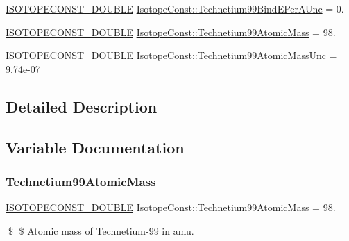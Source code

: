 \begin{DoxyCompactItemize}
\mbox{\hyperlink{group___isotope_const-_macros_ga8f45a7272ce02c0b4c65c44636ed719a}{I\+S\+O\+T\+O\+P\+E\+C\+O\+N\+S\+T\+\_\+\+D\+O\+U\+B\+LE}} \mbox{\hyperlink{group___isotope_const-_technetium-_tc99_gaf745b14e688dd0e81672a41bdda72732}{Isotope\+Const\+::\+Technetium99\+Bind\+E\+Per\+A\+Unc}} = 0.
\item 
\mbox{\hyperlink{group___isotope_const-_macros_ga8f45a7272ce02c0b4c65c44636ed719a}{I\+S\+O\+T\+O\+P\+E\+C\+O\+N\+S\+T\+\_\+\+D\+O\+U\+B\+LE}} \mbox{\hyperlink{group___isotope_const-_technetium-_tc99_gab5e99f199f8fefacbe1b0d6787efbb35}{Isotope\+Const\+::\+Technetium99\+Atomic\+Mass}} = 98.
\item 
\mbox{\hyperlink{group___isotope_const-_macros_ga8f45a7272ce02c0b4c65c44636ed719a}{I\+S\+O\+T\+O\+P\+E\+C\+O\+N\+S\+T\+\_\+\+D\+O\+U\+B\+LE}} \mbox{\hyperlink{group___isotope_const-_technetium-_tc99_gaf95401929c0e7df71b752dec537c8b99}{Isotope\+Const\+::\+Technetium99\+Atomic\+Mass\+Unc}} = 9.\+74e-\/07
\end{DoxyCompactItemize}


\subsection{Detailed Description}


\subsection{Variable Documentation}
\mbox{\label{group___isotope_const-_technetium-_tc99_gab5e99f199f8fefacbe1b0d6787efbb35}} 
\subsubsection{\texorpdfstring{Technetium99\+Atomic\+Mass}{Technetium99AtomicMass}}
{\footnotesize\ttfamily \mbox{\hyperlink{group___isotope_const-_macros_ga8f45a7272ce02c0b4c65c44636ed719a}{I\+S\+O\+T\+O\+P\+E\+C\+O\+N\+S\+T\+\_\+\+D\+O\+U\+B\+LE}} Isotope\+Const\+::\+Technetium99\+Atomic\+Mass = 98.}

\$ \$ Atomic mass of Technetium-\/99 in amu. \mbox{\label{group___isotope_const-_technetium-_tc99_gaf95401929c0e7df71b752dec537c8b99}} 
